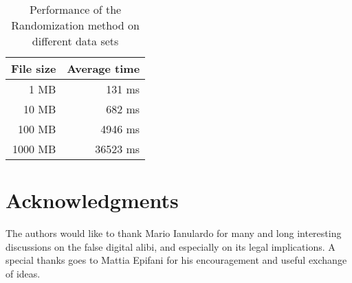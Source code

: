 \documentclass[10pt, conference, compsocconf]{IEEEtran}
\begin{document}
\begin{table}
\centering
\caption{Performance of the Randomization method on different data sets}
\begin{tabular}{ | r | r | }
\hline
\textbf{File size} & \textbf{Average time}\\
\hline
1 MB & 131 ms\\
\hline
10 MB & 682 ms\\
\hline
100 MB & 4946 ms\\
\hline
1000 MB & 36523 ms\\
\hline
\end{tabular}
\label{performance1}
\end{table}



\section*{Acknowledgments}
The authors would like to thank Mario Ianulardo for many and long interesting discussions on the false digital alibi, and especially on its legal implications. A special thanks goes to Mattia Epifani for his encouragement and useful exchange of ideas.



\end{document}
